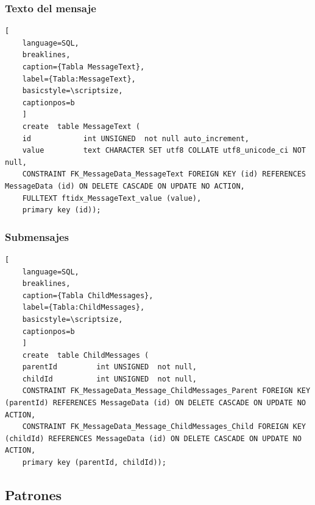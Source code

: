 \subsubsection{Texto del mensaje}
\begin{lstlisting}[
    language=SQL,
    breaklines, 
    caption={Tabla MessageText}, 
    label={Tabla:MessageText}, 
    basicstyle=\scriptsize,
    captionpos=b
    ]
    create  table MessageText (
    id            int UNSIGNED  not null auto_increment, 
    value         text CHARACTER SET utf8 COLLATE utf8_unicode_ci NOT null, 
    CONSTRAINT FK_MessageData_MessageText FOREIGN KEY (id) REFERENCES MessageData (id) ON DELETE CASCADE ON UPDATE NO ACTION,
    FULLTEXT ftidx_MessageText_value (value),
    primary key (id));
\end{lstlisting}

\subsubsection{Submensajes}
\begin{lstlisting}[
    language=SQL,
    breaklines, 
    caption={Tabla ChildMessages}, 
    label={Tabla:ChildMessages}, 
    basicstyle=\scriptsize,
    captionpos=b
    ]
    create  table ChildMessages (
    parentId         int UNSIGNED  not null, 
    childId          int UNSIGNED  not null, 
    CONSTRAINT FK_MessageData_Message_ChildMessages_Parent FOREIGN KEY (parentId) REFERENCES MessageData (id) ON DELETE CASCADE ON UPDATE NO ACTION,
    CONSTRAINT FK_MessageData_Message_ChildMessages_Child FOREIGN KEY (childId) REFERENCES MessageData (id) ON DELETE CASCADE ON UPDATE NO ACTION,
    primary key (parentId, childId));
\end{lstlisting}

\subsection{Patrones}

